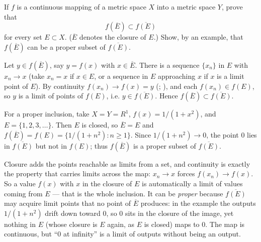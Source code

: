 \documentclass[main.tex]{subfiles}
\begin{document}
If $f$ is a continuous mapping of a metric space $X$ into a metric space $Y$, prove that
\[
f(\overline{E}) \subset \overline{f(E)}
\]
for every set $E \subset X$. ($\overline{E}$ denotes the closure of $E$.) Show, by an example, that $f(\overline{E})$ can be a proper subset of $\overline{f(E)}$.
\begin{Solution}
Let $y \in f(\overline{E})$, say $y = f(x)$ with $x \in \overline{E}$. There is a sequence $\{x_{n}\}$ in $E$ with $x_{n} \to x$ (take $x_{n} = x$ if $x \in E$, or a sequence in $E$ approaching $x$ if $x$ is a limit point of $E$). By continuity $f(x_{n}) \to f(x) = y$ (; ), and each $f(x_{n}) \in f(E)$, so $y$ is a limit of points of $f(E)$, i.e. $y \in \overline{f(E)}$. Hence $f(\overline{E}) \subset \overline{f(E)}$.

For a proper inclusion, take $X = Y = R^{1}$, $f(x) = 1/(1 + x^{2})$, and $E = \{1, 2, 3, \dots\}$. Then $E$ is closed, so $\overline{E} = E$ and $f(\overline{E}) = f(E) = \{1/(1+n^{2}) : n \ge 1\}$. Since $1/(1+n^{2}) \to 0$, the point $0$ lies in $\overline{f(E)}$ but not in $f(E)$; thus $f(\overline{E})$ is a proper subset of $\overline{f(E)}$.
\end{Solution}
\begin{Reflection}
Closure adds the points reachable as limits from a set, and continuity is exactly the property that carries limits across the map: $x_{n} \to x$ forces $f(x_{n}) \to f(x)$. So a value $f(x)$ with $x$ in the closure of $E$ is automatically a limit of values coming from $E$ --- that is the whole inclusion. It can be \emph{proper} because $\overline{f(E)}$ may acquire limit points that no point of $\overline{E}$ produces: in the example the outputs $1/(1+n^{2})$ drift down toward $0$, so $0$ sits in the closure of the image, yet nothing in $E$ (whose closure is $E$ again, as $E$ is closed) maps to $0$. The map is continuous, but ``$0$ at infinity'' is a limit of outputs without being an output.
\end{Reflection}
\end{document}
